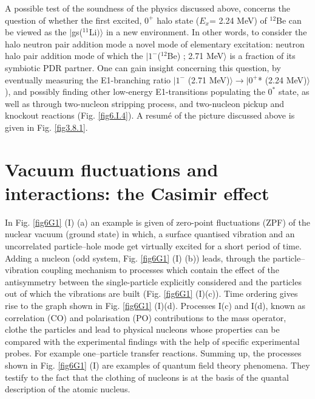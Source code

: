 \begin{subappendices}
A  possible test of the soundness of the physics  discussed above, concerns the question of whether the first excited, 
$0^+$ halo state ($E_x$= 2.24 MeV) of $^{12}$Be can be viewed as the $|$gs($^{11}$Li$)\rangle$ in a new environment. In other words, 
to consider the halo neutron pair addition mode
 a novel mode of  elementary excitation: neutron halo pair  addition mode of which the $|1^- $($^{12}$Be) ; 2.71 MeV$\rangle $ is 
 a fraction of  its symbiotic  PDR partner. One can gain insight concerning this question, by 
 eventually measuring the E1-branching ratio $|1^-$ (2.71 MeV)$\rangle  \to |0^+$* (2.24 MeV)$\rangle$ ), and possibly 
 finding other low-energy E1-transitions populating the $0^*$ state, as well as through  two-nucleon stripping process,
 and two-nucleon pickup and knockout reactions (Fig. \ref{fig6.I.4}).
 A resum\'e of the picture discussed above is given   in Fig. \ref{fig3.8.1}. 
 \section[Vacuum fluctuations: the Casimir effect]{Vacuum fluctuations and interactions: the Casimir effect}\label{C7AppG}
In Fig. \ref{fig6G1} (I) (a) an example is given of  zero-point fluctuations (ZPF) of the nuclear vacuum (ground state) in which, a surface quantised vibration and an uncorrelated particle--hole mode get virtually excited for a short period of time.  Adding 
a nucleon (odd system, Fig. \ref{fig6G1} (I) (b)) leads, through the particle--vibration coupling mechanism to processes which contain the effect of the antisymmetry between the single-particle explicitly considered and the particles out of which  the vibrations are built  (Fig. \ref{fig6G1} (I)(c)). Time ordering 
gives rise to the graph shown in Fig. \ref{fig6G1} (I)(d). Processes I(c) and I(d),  known as correlation (CO) and polarisation (PO) contributions to the mass
operator,  clothe the particles and lead to physical nucleons  whose properties can be compared with the experimental findings with the help of specific experimental probes. For example one--particle transfer reactions. Summing up, 
the processes shown in Fig. \ref{fig6G1} (I) are examples of quantum field theory phenomena. They testify  to the fact that the clothing of nucleons is at the basis of the quantal description of the atomic nucleus. 


\end{subappendices}
